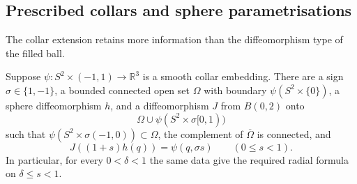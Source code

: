 \subsection{Prescribed collars and sphere parametrisations}
\label{sec:neck-cap-prescribed-collars}

The collar extension retains more information than the diffeomorphism type
of the filled ball.
\begin{lemma}
\label{lem:neck-cap-prescribed-collar}
Suppose
$\psi:S^2\times(-1,1)\longrightarrow\mathbb R^3$ is a smooth collar
embedding.  There are a sign $\sigma\in\{1,-1\}$, a bounded connected
open set $\Omega$ with boundary $\psi(S^2\times\{0\})$, a sphere
diffeomorphism $h$, and a diffeomorphism $J$ from $B(0,2)$ onto
\[
 \Omega\cup\psi(S^2\times\sigma[0,1))
\]
such that $\psi(S^2\times\sigma(-1,0))\subset\Omega$, the complement
of $\overline\Omega$ is connected, and
\[
 J((1+s)h(q))=\psi(q,\sigma s)\qquad(0\le s<1).
\]
In particular, for every $0<\delta<1$ the same data give the required
radial formula on $\delta\le s<1$.
\end{lemma}

